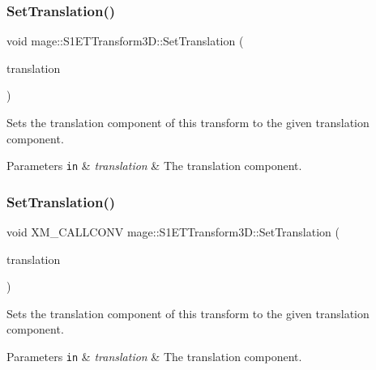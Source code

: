 \subsubsection{\texorpdfstring{Set\+Translation()}{SetTranslation()}\hspace{0.1cm}{\footnotesize\ttfamily [2/3]}}
{\footnotesize\ttfamily void mage\+::\+S1\+E\+T\+Transform3\+D\+::\+Set\+Translation (\begin{DoxyParamCaption}\item[{\mbox{\hyperlink{namespacemage_a1e3c7a882af461f161caa1cbddaf1fa2}{F32x3}}}]{translation }\end{DoxyParamCaption})\hspace{0.3cm}{\ttfamily [noexcept]}}

Sets the translation component of this transform to the given translation component.


\begin{DoxyParams}[1]{Parameters}
\mbox{\tt in}  & {\em translation} & The translation component. \\
\hline
\end{DoxyParams}
\mbox{\label{classmage_1_1_s1_e_t_transform3_d_ae99c1aca7b2a9c92280b1f3567722ad6}} 
\subsubsection{\texorpdfstring{Set\+Translation()}{SetTranslation()}\hspace{0.1cm}{\footnotesize\ttfamily [3/3]}}
{\footnotesize\ttfamily void X\+M\+\_\+\+C\+A\+L\+L\+C\+O\+NV mage\+::\+S1\+E\+T\+Transform3\+D\+::\+Set\+Translation (\begin{DoxyParamCaption}\item[{F\+X\+M\+V\+E\+C\+T\+OR}]{translation }\end{DoxyParamCaption})\hspace{0.3cm}{\ttfamily [noexcept]}}

Sets the translation component of this transform to the given translation component.


\begin{DoxyParams}[1]{Parameters}
\mbox{\tt in}  & {\em translation} & The translation component. \\
\hline
\end{DoxyParams}
\mbox{\label{classmage_1_1_s1_e_t_transform3_d_aee4f65aa3c220498c9df5a491d594ae2}} 

